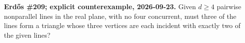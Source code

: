 \textbf{Erd\H{o}s \#209; explicit counterexample, 2026-09-23.}
Given $d\geq4$ pairwise nonparallel lines in the real plane, with no four concurrent, must three of the lines form a triangle whose three vertices are each incident with exactly two of the given lines?
